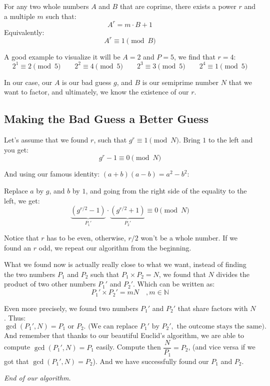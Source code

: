 \begin{smjtheorem}
For any two whole numbers $A$ and $B$ that are coprime, there exists a power
$r$ and a multiple $m$ such that:
$$A^r = m \cdot B + 1$$
Equivalently:
$$A^r \equiv 1\pmod B$$
\end{smjtheorem}

A good example to visualize it will be $A = 2$ and $P = 5$, we find that
$r = 4$:
$$
2^1 \equiv 2 \pmod{5} \qquad
2^2 \equiv 4 \pmod{5} \qquad
2^3 \equiv 3 \pmod{5} \qquad
2^4 \equiv 1 \pmod{5}
$$

In our case, our $A$ is our bad guess $g$, and $B$ is our semiprime number
$N$ that we want to factor, and ultimately, we know the existence of our $r$.

\subsection{Making the Bad Guess a Better Guess}

Let's assume that we found $r$, such that $g^r \equiv 1 \pmod{N}$. Bring $1$
to the left and you get:
$$
g^r - 1 \equiv 0\pmod{N}
$$

And using our famous identity: $(a + b)(a - b) = a^2 - b^2$:

Replace $a$ by $g$, and $b$ by $1$, and going from the right side of the
equality to the left, we get:
$$
\underbrace{(g^{r/2} - 1)}_{\text{$P_1'$}} \cdot
\underbrace{(g^{r/2} + 1)}_{\text{$P_2'$}} \equiv 0\pmod{N}
$$

Notice that $r$ has to be even, otherwise, $r/2$ won't be a whole number. If
we found an $r$ odd, we repeat our algorithm from the beginning.

What we found now is actually really close to what we want, instead of finding
the two numbers $P_1$ and $P_2$ such that $P_1 \times P_2 = N$, we found that
$N$ divides the product of two other numbers $P_1'$ and $P_2'$. Which can be
written as:
$$
P_1' \times P_2' = mN \quad , m \in \mathbb{N}
$$

Even more precisely, we found two numbers $P_1'$ and $P_2'$ that share factors
with $N$. Thus:
$$
\gcd(P_1', N) = P_1 \text{ or } P_2.
\text{ (We can replace } P_1' \text{ by } P_2', \text{ the outcome stays the same).}
$$
And remember that thanks to our beautiful Euclid's algorithm, we are able to
compute $\gcd(P_1', N) = P_1$ easily. Compute then $\dfrac{N}{P_1} = P_2$,
(and vice versa if we got that $\gcd(P_1', N) = P_2$). And we have
successfully found our $P_1$ and $P_2$.

\textit{End of our algorithm.}

